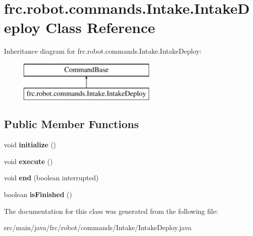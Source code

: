 \hypertarget{classfrc_1_1robot_1_1commands_1_1_intake_1_1_intake_deploy}{}\section{frc.\+robot.\+commands.\+Intake.\+Intake\+Deploy Class Reference}
\label{classfrc_1_1robot_1_1commands_1_1_intake_1_1_intake_deploy}
Inheritance diagram for frc.\+robot.\+commands.\+Intake.\+Intake\+Deploy\+:\begin{figure}[H]
\begin{center}
\leavevmode
\includegraphics[height=2.000000cm]{classfrc_1_1robot_1_1commands_1_1_intake_1_1_intake_deploy}
\end{center}
\end{figure}
\subsection*{Public Member Functions}
\begin{DoxyCompactItemize}
\item 
\mbox{\label{classfrc_1_1robot_1_1commands_1_1_intake_1_1_intake_deploy_a90011b832df093d0fc585b77e23f0502}} 
void {\bfseries initialize} ()
\item 
\mbox{\label{classfrc_1_1robot_1_1commands_1_1_intake_1_1_intake_deploy_a8ab9f4f8513d1a2f32138b5d8afd38b8}} 
void {\bfseries execute} ()
\item 
\mbox{\label{classfrc_1_1robot_1_1commands_1_1_intake_1_1_intake_deploy_afd45731ccc1a5ed993939b9a222ca471}} 
void {\bfseries end} (boolean interrupted)
\item 
\mbox{\label{classfrc_1_1robot_1_1commands_1_1_intake_1_1_intake_deploy_a8b78ec9efe9de2c5ac1176871a9a36aa}} 
boolean {\bfseries is\+Finished} ()
\end{DoxyCompactItemize}


The documentation for this class was generated from the following file\+:\begin{DoxyCompactItemize}
\item 
src/main/java/frc/robot/commands/\+Intake/Intake\+Deploy.\+java\end{DoxyCompactItemize}
